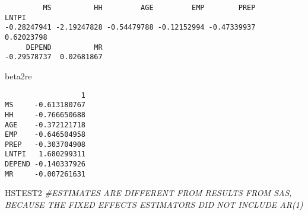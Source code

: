 \documentclass[]{book}
\newenvironment{Shaded}{\begin{snugshade}}{\end{snugshade}}
\newcommand{\CommentTok}[1]{\textcolor[rgb]{0.56,0.35,0.01}{\textit{#1}}}
\newcommand{\DecValTok}[1]{\textcolor[rgb]{0.00,0.00,0.81}{#1}}
\newcommand{\KeywordTok}[1]{\textcolor[rgb]{0.13,0.29,0.53}{\textbf{#1}}}
\newcommand{\NormalTok}[1]{#1}
\newcommand{\OperatorTok}[1]{\textcolor[rgb]{0.81,0.36,0.00}{\textbf{#1}}}
\begin{document}
\begin{Shaded}
\end{Shaded}

\begin{verbatim}
         MS          HH         AGE         EMP        PREP       LNTPI 
-0.28247941 -2.19247828 -0.54479788 -0.12152994 -0.47339937  0.62023798 
     DEPEND          MR 
-0.29578737  0.02681867 
\end{verbatim}

\begin{Shaded}
\begin{Highlighting}[]
\NormalTok{beta2re}
\end{Highlighting}
\end{Shaded}

\begin{verbatim}
                  1
MS     -0.613180767
HH     -0.766650688
AGE    -0.372121718
EMP    -0.646504958
PREP   -0.303704908
LNTPI   1.680299311
DEPEND -0.140337926
MR     -0.007261631
\end{verbatim}

\begin{Shaded}
\begin{Highlighting}[]
\NormalTok{HSTEST2 }\CommentTok{#ESTIMATES ARE DIFFERENT FROM RESULTS FROM SAS, BECAUSE THE FIXED EFFECTS ESTIMATORS DID NOT INCLUDE AR(1) }
\end{Highlighting}
\end{Shaded}
\end{document}
